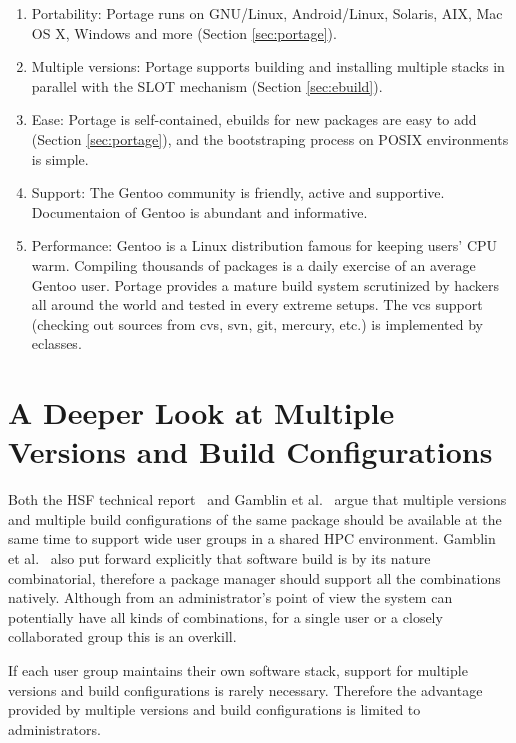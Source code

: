 \documentclass[a4paper,conference]{IEEEtran}
\begin{document}
\begin{enumerate}
\item Portability: Portage runs on GNU/Linux, Android/Linux, Solaris,
  AIX, Mac OS X, Windows and more (Section \ref{sec:portage}).
\item Multiple versions: Portage supports building and installing
  multiple stacks in parallel with the SLOT mechanism
  (Section \ref{sec:ebuild}).
\item Ease: Portage is self-contained, ebuilds for new packages are
  easy to add (Section \ref{sec:portage}), and the bootstraping process
  on POSIX environments is simple.
\item Support: The Gentoo community is friendly, active and
  supportive. Documentaion of Gentoo is abundant and informative.
\item Performance: Gentoo is a Linux distribution famous for keeping
  users' CPU warm. Compiling thousands of packages is a daily
  exercise of an average Gentoo user. Portage provides a mature build
  system scrutinized by hackers all around the world and tested in
  every extreme setups. The vcs support (checking out sources from
  cvs, svn, git, mercury, etc.) is implemented by eclasses.
\end{enumerate}

\section{A Deeper Look at Multiple Versions and Build Configurations}

Both the HSF technical report~\cite{hsf:package} and Gamblin et
al.~\cite{spack} argue that multiple versions and multiple build
configurations of the same package should be available at the same
time to support wide user groups in a shared HPC environment. Gamblin
et al.~\cite{spack} also put forward explicitly that software build is
by its nature combinatorial, therefore a package manager should
support all the combinations natively. Although from an administrator's
point of view the system can potentially have all kinds of combinations,
for a single user or a closely collaborated group this is an overkill.

If each user group maintains their own software stack, support for
multiple versions and build configurations is rarely necessary.
Therefore the advantage provided by multiple versions and build
configurations is limited to administrators.
\end{document}
